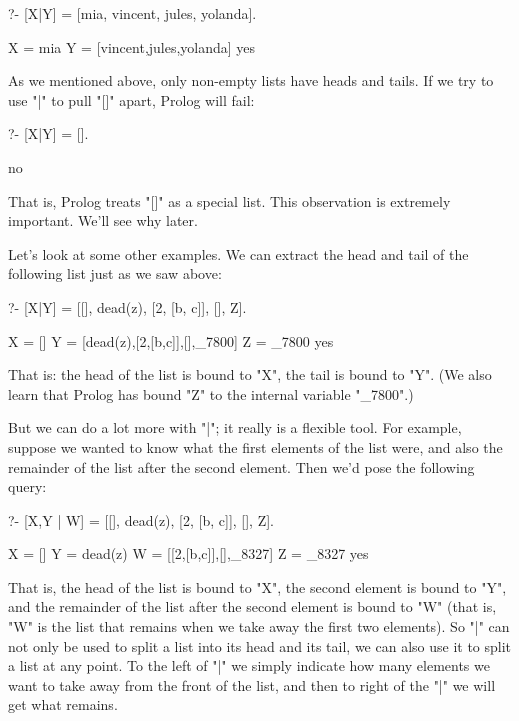 \begin{LPNcodedisplay}
?- [X|Y] = [mia, vincent, jules, yolanda].

X = mia
Y = [vincent,jules,yolanda]
yes
\end{LPNcodedisplay}



As we mentioned above, only non-empty lists have heads and tails.  If
we try to use "|" to pull "[]" apart, Prolog will fail:

\begin{LPNcodedisplay}
?- [X|Y] = [].

no
\end{LPNcodedisplay}
That is, Prolog treats "[]" as a special list.  This observation
is extremely  important.  We'll see why later.

Let's look at some other examples.  We can extract the head and tail
of the following list just as we saw above:

\begin{LPNcodedisplay}
?- [X|Y] = [[], dead(z), [2, [b, c]], [], Z].

X = []
Y = [dead(z),[2,[b,c]],[],_7800]
Z = _7800
yes
\end{LPNcodedisplay}
That is: the head of the list is bound to "X", the tail is bound
to "Y".  (We also learn that Prolog has bound
"Z" to the internal variable "\_7800".)

But we  can do a lot more with "|"; it really is a
flexible tool.  For example, suppose we wanted to know what the first
 elements of the list were, and also the remainder of the
list after the second element.  Then we'd pose the following query:

\begin{LPNcodedisplay}
?- [X,Y | W] = [[], dead(z), [2, [b, c]], [], Z].

X = []
Y = dead(z)
W = [[2,[b,c]],[],_8327]
Z = _8327
yes
\end{LPNcodedisplay}

That is, the head of the list is bound to "X", the second element is
bound to "Y", and the remainder of the list after the second element
is bound to "W" (that is, "W" is the list that remains when we take
away the first two elements). So "|" can not only be used to split a
list into its head and its tail, we can also use it to split a list at
any point. To the left of "|" we simply indicate how many elements we
want to take away from the front of the list, and then to right of the
"|" we will get what remains.

